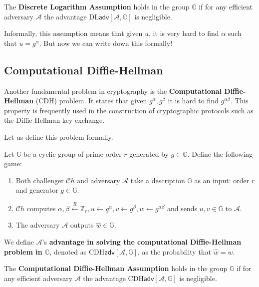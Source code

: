 \documentclass[../lecture-notes-148x210.tex]{subfiles}
\begin{document}
\begin{definition}
    The \textbf{Discrete Logarithm Assumption} holds in the group $\mathbb{G}$ if for any efficient adversary $\mathcal{A}$ the advantage $\text{DL}\mathsf{adv}[\mathcal{A},\mathbb{G}]$ is negligible.
\end{definition}

Informally, this assumption means that given $u$, it is very hard to find $\alpha$ such that $u = g^{\alpha}$. But now we can write down this formally!

\subsection{Computational Diffie-Hellman}

Another fundamental problem in cryptography is the \textbf{Computational Diffie-Hellman} (CDH) problem. It states that given $g^{\alpha},g^{\beta}$ it is hard to find $g^{\alpha\beta}$. This property is frequently used in the construction of cryptographic protocols such as the Diffie-Hellman key exchange.

Let us define this problem formally.

\begin{definition}
    Let $\mathbb{G}$ be a cyclic group of prime order $r$ generated by $g \in \mathbb{G}$. Define the following game:
    \begin{enumerate}
        \item Both challenger $\mathcal{C}h$ and adversary $\mathcal{A}$ take a description $\mathbb{G}$ as an input: order $r$ and generator $g \in \mathbb{G}$.
        \item $\mathcal{C}h$ computes $\alpha, \beta \xleftarrow{R} \mathbb{Z}_r, u \gets g^{\alpha}, v \gets g^{\beta}, w \gets g^{\alpha\beta}$ and sends $u,v \in \mathbb{G}$ to $\mathcal{A}$.
        \item The adversary $\mathcal{A}$ outputs $\hat{w} \in \mathbb{G}$.
    \end{enumerate}

    We define $\mathcal{A}$'s \textbf{advantage in solving the computational Diffie-Hellman problem in $\mathbb{G}$}, denoted as $\text{CDH}\mathsf{adv}[\mathcal{A},\mathbb{G}]$, as the probability that $\hat{w} = w$.
\end{definition}

\begin{definition}
    The \textbf{Computational Diffie-Hellman Assumption} holds in the group $\mathbb{G}$ if for any efficient adversary $\mathcal{A}$ the advantage $\text{CDH}\mathsf{adv}[\mathcal{A},\mathbb{G}]$ is negligible.
\end{definition}
\end{document}
